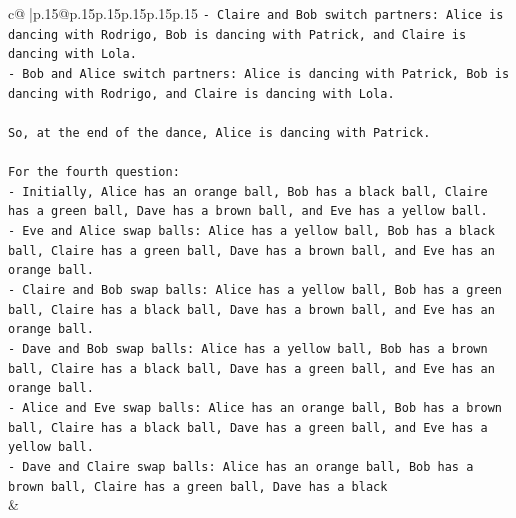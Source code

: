 \documentclass{article}
\begin{document}
{\begin{supertabular}{c@{$\;$}|p{.15\linewidth}@{}p{.15\linewidth}p{.15\linewidth}p{.15\linewidth}p{.15\linewidth}p{.15\linewidth}}
{{{\texttt{{-} Claire and Bob switch partners: Alice is dancing with Rodrigo, Bob is dancing with Patrick, and Claire is dancing with Lola.} \\
\texttt{{-} Bob and Alice switch partners: Alice is dancing with Patrick, Bob is dancing with Rodrigo, and Claire is dancing with Lola.} \\
\\ 
\texttt{So, at the end of the dance, Alice is dancing with Patrick.} \\
\\ 
\texttt{For the fourth question:} \\
\texttt{{-} Initially, Alice has an orange ball, Bob has a black ball, Claire has a green ball, Dave has a brown ball, and Eve has a yellow ball.} \\
\texttt{{-} Eve and Alice swap balls: Alice has a yellow ball, Bob has a black ball, Claire has a green ball, Dave has a brown ball, and Eve has an orange ball.} \\
\texttt{{-} Claire and Bob swap balls: Alice has a yellow ball, Bob has a green ball, Claire has a black ball, Dave has a brown ball, and Eve has an orange ball.} \\
\texttt{{-} Dave and Bob swap balls: Alice has a yellow ball, Bob has a brown ball, Claire has a black ball, Dave has a green ball, and Eve has an orange ball.} \\
\texttt{{-} Alice and Eve swap balls: Alice has an orange ball, Bob has a brown ball, Claire has a black ball, Dave has a green ball, and Eve has a yellow ball.} \\
\texttt{{-} Dave and Claire swap balls: Alice has an orange ball, Bob has a brown ball, Claire has a green ball, Dave has a black} \\
            }
        }
    }
    & \\ \\


\end{supertabular}}
\end{document}

